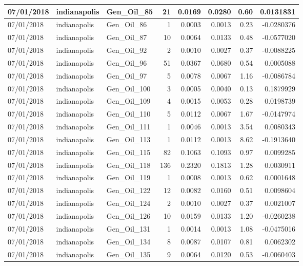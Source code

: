 \documentclass[
  letterpaper,
  DIV=11,
  numbers=noendperiod]{scrartcl}
\begin{document}
\begin{tabular}{l|l|l|r|r|r|r|r}
\hline
07/01/2018 & indianapolis & Gen\_Oil\_85 & 21 & 0.0169 & 0.0280 & 0.60 & 0.0131831\\
\hline
07/01/2018 & indianapolis & Gen\_Oil\_86 & 1 & 0.0003 & 0.0013 & 0.23 & -0.0280376\\
\hline
07/01/2018 & indianapolis & Gen\_Oil\_87 & 10 & 0.0064 & 0.0133 & 0.48 & -0.0577020\\
\hline
07/01/2018 & indianapolis & Gen\_Oil\_92 & 2 & 0.0010 & 0.0027 & 0.37 & -0.0088225\\
\hline
07/01/2018 & indianapolis & Gen\_Oil\_96 & 51 & 0.0367 & 0.0680 & 0.54 & 0.0005088\\
\hline
07/01/2018 & indianapolis & Gen\_Oil\_97 & 5 & 0.0078 & 0.0067 & 1.16 & -0.0086784\\
\hline
07/01/2018 & indianapolis & Gen\_Oil\_100 & 3 & 0.0005 & 0.0040 & 0.13 & 0.1879929\\
\hline
07/01/2018 & indianapolis & Gen\_Oil\_109 & 4 & 0.0015 & 0.0053 & 0.28 & 0.0198739\\
\hline
07/01/2018 & indianapolis & Gen\_Oil\_110 & 5 & 0.0112 & 0.0067 & 1.67 & -0.0147974\\
\hline
07/01/2018 & indianapolis & Gen\_Oil\_111 & 1 & 0.0046 & 0.0013 & 3.54 & 0.0080343\\
\hline
07/01/2018 & indianapolis & Gen\_Oil\_113 & 1 & 0.0112 & 0.0013 & 8.62 & -0.1913640\\
\hline
07/01/2018 & indianapolis & Gen\_Oil\_115 & 82 & 0.1063 & 0.1093 & 0.97 & 0.0099285\\
\hline
07/01/2018 & indianapolis & Gen\_Oil\_118 & 136 & 0.2320 & 0.1813 & 1.28 & 0.0030911\\
\hline
07/01/2018 & indianapolis & Gen\_Oil\_119 & 1 & 0.0008 & 0.0013 & 0.62 & 0.0001648\\
\hline
07/01/2018 & indianapolis & Gen\_Oil\_122 & 12 & 0.0082 & 0.0160 & 0.51 & 0.0098604\\
\hline
07/01/2018 & indianapolis & Gen\_Oil\_124 & 2 & 0.0010 & 0.0027 & 0.37 & 0.0021007\\
\hline
07/01/2018 & indianapolis & Gen\_Oil\_126 & 10 & 0.0159 & 0.0133 & 1.20 & -0.0260238\\
\hline
07/01/2018 & indianapolis & Gen\_Oil\_131 & 1 & 0.0014 & 0.0013 & 1.08 & -0.0475016\\
\hline
07/01/2018 & indianapolis & Gen\_Oil\_134 & 8 & 0.0087 & 0.0107 & 0.81 & 0.0062302\\
\hline
07/01/2018 & indianapolis & Gen\_Oil\_135 & 9 & 0.0064 & 0.0120 & 0.53 & -0.0060403\\

\end{tabular}
\end{document}
